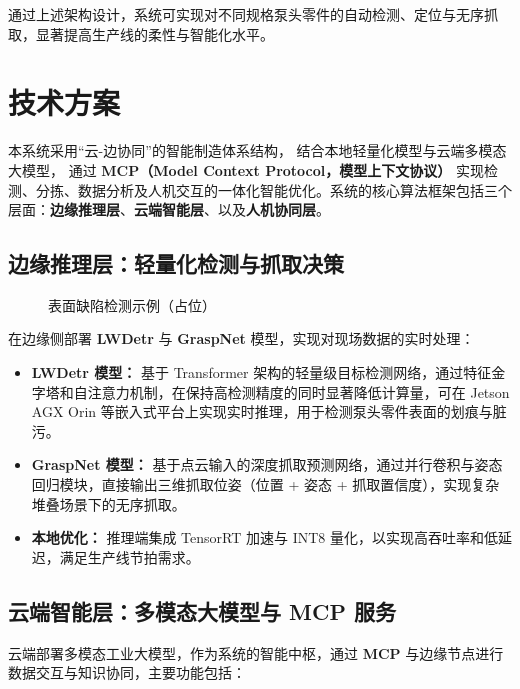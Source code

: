\documentclass{cumcmthesis}
\begin{document}
通过上述架构设计，系统可实现对不同规格泵头零件的自动检测、定位与无序抓取，显著提高生产线的柔性与智能化水平。


\section{技术方案}

本系统采用“云-边协同”的智能制造体系结构，
结合本地轻量化模型与云端多模态大模型，
通过 \textbf{MCP（Model Context Protocol，模型上下文协议）} 实现检测、分拣、数据分析及人机交互的一体化智能优化。系统的核心算法框架包括三个层面：\textbf{边缘推理层}、\textbf{云端智能层}、以及\textbf{人机协同层}。

\subsection{边缘推理层：轻量化检测与抓取决策}

\begin{figure}[htbp]\centering
{}
\caption{表面缺陷检测示例（占位）}\label{fig:defect_examples}
\end{figure}
在边缘侧部署 \textbf{LWDetr} 与 \textbf{GraspNet} 模型，实现对现场数据的实时处理：

\begin{itemize}
    \item \textbf{LWDetr 模型：}  
    基于 Transformer 架构的轻量级目标检测网络，通过特征金字塔和自注意力机制，在保持高检测精度的同时显著降低计算量，可在 Jetson AGX Orin 等嵌入式平台上实现实时推理，用于检测泵头零件表面的划痕与脏污。

    \item \textbf{GraspNet 模型：}  
    基于点云输入的深度抓取预测网络，通过并行卷积与姿态回归模块，直接输出三维抓取位姿（位置 + 姿态 + 抓取置信度），实现复杂堆叠场景下的无序抓取。

    \item \textbf{本地优化：}  
    推理端集成 TensorRT 加速与 INT8 量化，以实现高吞吐率和低延迟，满足生产线节拍需求。
\end{itemize}

\subsection{云端智能层：多模态大模型与 MCP 服务}

云端部署多模态工业大模型，作为系统的智能中枢，通过 \textbf{MCP} 与边缘节点进行数据交互与知识协同，主要功能包括：
\end{document}
